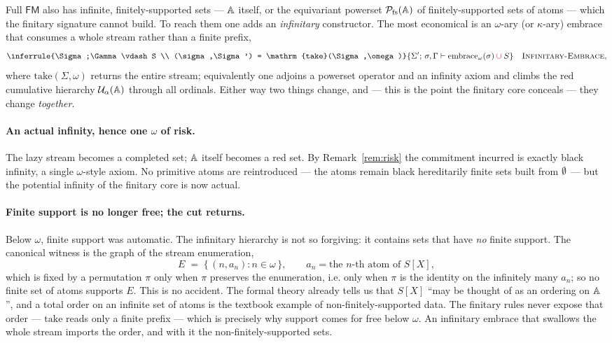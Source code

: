 Full $\mathsf{FM}$ also has infinite, finitely-supported sets --- $\mathbb{A}$
itself, or the equivariant powerset $\mathcal{P}_{\mathrm{fs}}(\mathbb{A})$ of finitely-supported
sets of atoms --- which the finitary signature cannot build. To reach them one
adds an \emph{infinitary} constructor. The most economical is an $\omega$-ary (or
$\kappa$-ary) embrace that consumes a whole stream rather than a finite prefix,
\[
  \inferrule{\Sigma;\Gamma\vdash S \\ (\sigma,\Sigma') = \mathrm{take}(\Sigma,\omega)}
            {\Sigma';\,\sigma,\Gamma\vdash \mathrm{embrace}_\omega(\sigma)\rcup S}
  \quad\textsc{Infinitary-Embrace},
\]
where $\mathrm{take}(\Sigma,\omega)$ returns the entire stream; equivalently one
adjoins a powerset operator and an infinity axiom and climbs the red cumulative
hierarchy $\mathcal{U}_\alpha(\mathbb{A})$ through all ordinals. Either way two things
change, and --- this is the point the finitary core conceals --- they change
\emph{together}.

\paragraph{An actual infinity, hence one $\omega$ of risk.}
The lazy stream becomes a completed set; $\mathbb{A}$ itself becomes a red set. By
Remark~\ref{rem:risk} the commitment incurred is exactly black infinity, a single
$\omega$-style axiom. No primitive atoms are reintroduced --- the atoms remain
black hereditarily finite sets built from $\textcolor{black}{\emptyset}$ --- but the potential infinity
of the finitary core is now actual.

\paragraph{Finite support is no longer free; the cut returns.}
Below $\omega$, finite support was automatic. The infinitary hierarchy is not so
forgiving: it contains sets that have \emph{no} finite support. The canonical
witness is the graph of the stream enumeration,
\[
  E \;=\; \{\,(n,a_n) : n\in\omega\,\},
  \qquad a_n = \text{the $n$-th atom of } S[X],
\]
which is fixed by a permutation $\pi$ only when $\pi$ preserves the enumeration,
i.e. only when $\pi$ is the identity on the infinitely many $a_n$; so no finite
set of atoms supports $E$. This is no accident. The formal theory already tells
us that $S[X]$ ``may be thought of as an ordering on $\mathbb{A}$'', and a total order
on an infinite set of atoms is the textbook example of non-finitely-supported
data. The finitary rules never expose that order --- $\mathrm{take}$ reads only a
finite prefix --- which is precisely why support comes for free below $\omega$.
An infinitary embrace that swallows the whole stream imports the order, and with
it the non-finitely-supported sets.

